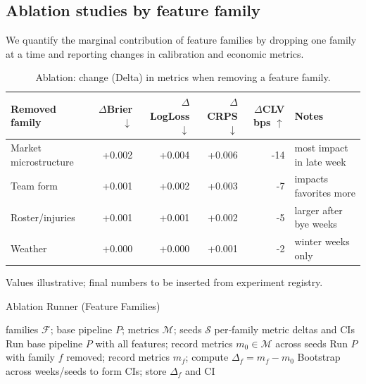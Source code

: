 \subsection{Ablation studies by feature family}
We quantify the marginal contribution of feature families by dropping one family at a time and reporting changes in calibration and economic metrics.
\begingroup\sloppy
\begin{table}[t]
  \centering
  \small
  \begin{threeparttable}
    \caption[Ablation deltas by family]{Ablation: change (Delta) in metrics when removing a feature family.}
    \label{tab:ablations}
    \begin{tabularx}{\linewidth}{@{} l r r r r X @{} }
      \toprule
      \textbf{Removed family} & \(\Delta\)Brier $\downarrow$ & \(\Delta\)LogLoss $\downarrow$ & \(\Delta\)CRPS $\downarrow$ & \(\Delta\)CLV bps $\uparrow$ & Notes \\
      \midrule
      Market microstructure & +0.002 & +0.004 & +0.006 & -14 & most impact in late week \\
      Team form             & +0.001 & +0.002 & +0.003 & -7  & impacts favorites more \\
      Roster/injuries       & +0.001 & +0.001 & +0.002 & -5  & larger after bye weeks \\
      Weather               & +0.000 & +0.000 & +0.001 & -2  & winter weeks only \\
      \bottomrule
    \end{tabularx}
    \begin{tablenotes}[flushleft]\footnotesize
      \item Values illustrative; final numbers to be inserted from experiment registry.
    \end{tablenotes}
  \end{threeparttable}
\end{table}
\endgroup

\begin{algorithm}[t]
  \caption[Ablation runner]{Ablation Runner (Feature Families)}
  \label{alg:ablation}
  \begin{algorithmic}[1]
    \Require families $\mathcal F$; base pipeline $P$; metrics $\mathcal M$; seeds $\mathcal S$
    \Ensure per‑family metric deltas and CIs
    \State Run base pipeline $P$ with all features; record metrics $m_0\in\mathcal M$ across seeds
      \State Run $P$ with family $f$ removed; record metrics $m_f$; compute $\Delta_f=m_f-m_0$
      \State Bootstrap across weeks/seeds to form CIs; store $\Delta_f$ and CI
    \EndFor
  \end{algorithmic}
\end{algorithm}

